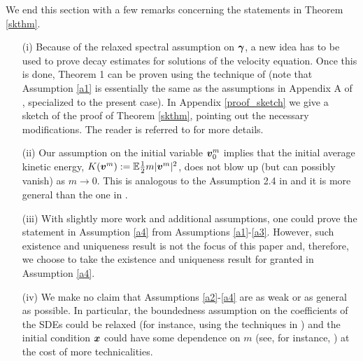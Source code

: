 We end this section with a few remarks concerning the statements in Theorem \ref{skthm}.

\begin{remark} \label{ass_rmk} 
\hspace{5cm}
\begin{itemize} 
\item[(i)] Because of the relaxed spectral assumption on $\boldsymbol{\gamma}$, a new idea has to be used to prove decay estimates for solutions of the velocity equation.  Once this is done, Theorem 1 can be proven using the technique of \cite{birrell2017homogenization} (note that Assumption \ref{a1} is essentially the same as the assumptions in Appendix A of \cite{birrell2017homogenization}, specialized to the present case).  In Appendix \ref{proof_sketch} we give a sketch of the proof of Theorem \ref{skthm}, pointing out the necessary modifications.  The reader is referred to \cite{birrell2017homogenization} for more details.
\item[(ii)] Our assumption on the initial variable $\boldsymbol{v}_0^m$ implies that the  initial average kinetic energy, $K(\boldsymbol{v}^m) := \mathbb{E}  \frac{1}{2} m |\boldsymbol{v}^m|^2$, does not blow up (but can possibly vanish) as $m \to 0$. This is analogous to the  Assumption 2.4 in \cite{birrell2017homogenization} and it is  more general than the one in \cite{hottovy2015smoluchowski}.
\item[(iii)] With slightly more work and additional assumptions, one could prove the statement in Assumption \ref{a4} from Assumptions \ref{a1}-\ref{a3}. However, such existence and uniqueness result is not the focus of this paper and, therefore, we choose to take the existence and uniqueness result for granted in Assumption \ref{a4}.
\item[(iv)] We make no claim that Assumptions \ref{a2}-\ref{a4} are as weak or as general as possible.  In particular, the boundedness assumption on the coefficients of the SDEs could be relaxed (for instance, using the techniques in \cite{Herzog2016}) and the initial condition $\boldsymbol{x}$ could have some dependence on $m$ (see, for instance, \cite{birrell2017homogenization}) at the cost of more technicalities. 


\end{itemize}
\end{remark}
